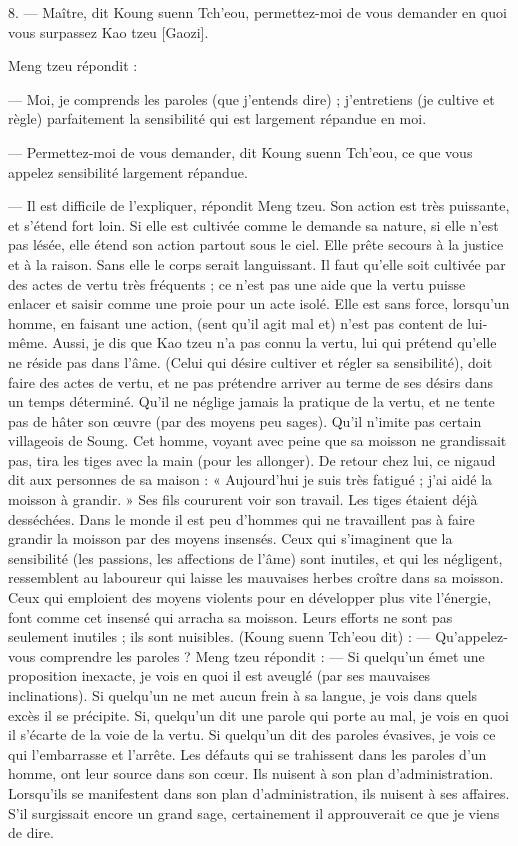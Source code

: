 \begin{singlequote}
   8.	— Maître, dit Koung suenn Tch’eou, permettez-moi de vous demander en quoi vous surpassez Kao tzeu [Gaozi].
   
Meng tzeu répondit :


—	Moi, je comprends les paroles (que j’entends dire) ; j’entretiens (je cultive et règle) parfaitement la sensibilité qui est largement répandue en moi.

—	Permettez-moi de vous demander, dit Koung suenn Tch’eou, ce que vous appelez sensibilité largement répandue.


—	Il est difficile de l’expliquer, répondit Meng tzeu. Son action est très puissante, et s’étend fort loin. Si elle est cultivée comme le demande sa nature, si elle n’est pas lésée, elle étend son action partout sous le ciel. Elle prête secours à la justice et à la raison. Sans elle le corps serait languissant.
Il faut qu’elle soit cultivée par des actes de vertu très fréquents ; ce n’est pas une aide que la vertu puisse enlacer et saisir comme une proie pour un acte isolé. Elle est sans force, lorsqu’un homme, en faisant une action, (sent qu’il agit mal et) n’est pas content de lui-même. Aussi, je dis que Kao tzeu n’a pas connu la vertu, lui qui prétend qu’elle ne réside pas dans l’âme.
(Celui qui désire cultiver et régler sa sensibilité), doit faire des actes de vertu, et ne pas prétendre arriver au terme de ses désirs dans un temps déterminé. Qu’il ne néglige jamais la pratique de la vertu, et ne tente pas de hâter son œuvre (par des moyens peu sages). 
Qu’il n’imite pas certain villageois de Soung. Cet homme, voyant avec peine que sa moisson ne grandissait pas, tira les tiges avec la main (pour les allonger). De retour chez lui, ce nigaud dit aux personnes de sa maison :
« Aujourd’hui je suis très fatigué ; j’ai aidé la moisson à grandir. » Ses fils coururent voir son
travail. Les tiges étaient déjà desséchées. Dans le monde il est peu d’hommes qui ne travaillent pas à faire grandir la moisson par des moyens insensés. Ceux qui s’imaginent que la sensibilité (les passions, les affections de l’âme) sont inutiles, et qui les négligent, ressemblent au laboureur qui laisse les mauvaises herbes croître dans sa moisson. Ceux qui emploient des moyens violents pour en développer plus vite l’énergie, font comme cet insensé qui arracha sa moisson. Leurs efforts ne sont pas seulement inutiles ; ils sont nuisibles.
(Koung suenn Tch’eou dit) :
—	Qu’appelez-vous comprendre les paroles ?
Meng tzeu répondit :
—	Si quelqu’un émet une proposition inexacte, je vois en quoi il est aveuglé (par ses mauvaises inclinations). Si quelqu’un ne met aucun frein à sa langue, je vois dans quels excès il se précipite. Si, quelqu’un dit une parole qui porte au mal, je vois en quoi il s’écarte de la voie de la vertu. Si quelqu’un dit des paroles évasives, je vois ce qui l’embarrasse et l’arrête. Les défauts qui se trahissent dans les paroles d’un homme, ont leur source dans son cœur. Ils nuisent à son plan d’administration. Lorsqu’ils se manifestent dans son plan d’administration, ils nuisent à ses affaires. S’il surgissait encore un grand sage, certainement il approuverait ce que je viens de dire.

\end{singlequote}
